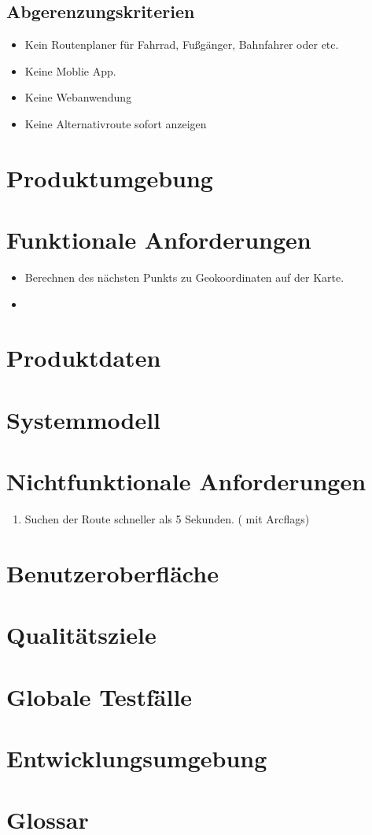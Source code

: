 \documentclass[a4paper, 11pt]{article}
\begin{document}
\subsection{Abgerenzungskriterien}

\begin{itemize}
\item Kein Routenplaner für Fahrrad, Fußgänger, Bahnfahrer oder etc.
\item Keine Moblie App.
\item Keine Webanwendung
\item Keine Alternativroute sofort anzeigen

\end{itemize}

\section{Produktumgebung}

\section{Funktionale Anforderungen}
\begin{itemize}
\item Berechnen des nächsten Punkts zu Geokoordinaten auf der Karte.
\item 
\end{itemize}
\section{Produktdaten}

\section{Systemmodell}

\section{Nichtfunktionale Anforderungen}

\begin{enumerate}
\item Suchen der Route schneller als 5 Sekunden. (  mit Arcflags)

\end{enumerate}

\section{Benutzeroberfläche}

\section{Qualitätsziele}

\section{Globale Testfälle}

\section{Entwicklungsumgebung}

\section{Glossar}
\end{document}
